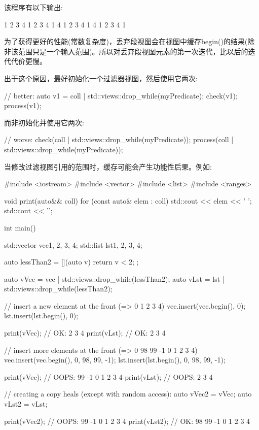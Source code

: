 该程序有以下输出:

\begin{shell}
1 2 3 4 1 2 3 4 1
4 1 2 3 4 1
4 1 2 3 4 1
\end{shell}


为了获得更好的性能(常数复杂度)，丢弃段视图会在视图中缓存begin()的结果(除非该范围只是一个输入范围)。所以对丢弃段视图元素的第一次迭代，比以后的迭代代价更慢。

出于这个原因，最好初始化一个过滤器视图，然后使用它两次:

\begin{cpp}
// better:
auto v1 = coll | std::views::drop_while(myPredicate);
check(v1);
process(v1);
\end{cpp}

而非初始化并使用它两次:

\begin{cpp}
// worse:
check(coll | std::views::drop_while(myPredicate));
process(coll | std::views::drop_while(myPredicate));
\end{cpp}

当修改过滤视图引用的范围时，缓存可能会产生功能性后果。例如:


\begin{cpp}
#include <iostream>
#include <vector>
#include <list>
#include <ranges>

void print(auto&& coll)
{
	for (const auto& elem : coll) {
		std::cout << elem << ' ';
	}
	std::cout << '\n';
}

int main()
{
	std::vector vec{1, 2, 3, 4};
	std::list lst{1, 2, 3, 4};
	
	auto lessThan2 = [](auto v){
		return v < 2;
	};
	
	auto vVec = vec | std::views::drop_while(lessThan2);
	auto vLst = lst | std::views::drop_while(lessThan2);
	
	// insert a new element at the front (=> 0 1 2 3 4)
	vec.insert(vec.begin(), 0);
	lst.insert(lst.begin(), 0);
	
	print(vVec); // OK: 2 3 4
	print(vLst); // OK: 2 3 4
	
	// insert more elements at the front (=> 0 98 99 -1 0 1 2 3 4)
	vec.insert(vec.begin(), {0, 98, 99, -1});
	lst.insert(lst.begin(), {0, 98, 99, -1});
	
	print(vVec); // OOPS: 99 -1 0 1 2 3 4
	print(vLst); // OOPS: 2 3 4
	
	// creating a copy heals (except with random access):
	auto vVec2 = vVec;
	auto vLst2 = vLst;
	
	print(vVec2); // OOPS: 99 -1 0 1 2 3 4
	print(vLst2); // OK: 98 99 -1 0 1 2 3 4
}
\end{cpp}

